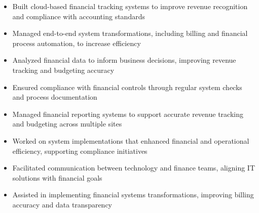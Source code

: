 \par\smallskip
\noindent
\begin{minipage}{20cm}
  \begin{minipage}{9.75cm}
    \begin{itemize}
      \item Built cloud-based financial tracking systems to improve revenue recognition and compliance with accounting standards
      \item Managed end-to-end system transformations, including billing and financial process automation, to increase efficiency
    \end{itemize}
  \end{minipage}
  \hfill
  \begin{minipage}{9.75cm}
    \begin{itemize}
      \item Analyzed financial data to inform business decisions, improving revenue tracking and budgeting accuracy
      \item Ensured compliance with financial controls through regular system checks and process documentation
    \end{itemize}
  \end{minipage}
\end{minipage}
\par\smallskip
\divider

\par\smallskip
\noindent
\begin{minipage}{20cm}
  \begin{minipage}{9.75cm}
    \begin{itemize}
      \item Managed financial reporting systems to support accurate revenue tracking and budgeting across multiple sites
      \item Worked on system implementations that enhanced financial and operational efficiency, supporting compliance initiatives
    \end{itemize}
  \end{minipage}
  \hfill
  \begin{minipage}{9.75cm}
    \begin{itemize}
      \item Facilitated communication between technology and finance teams, aligning IT solutions with financial goals
      \item Assisted in implementing financial systems transformations, improving billing accuracy and data transparency
    \end{itemize}
  \end{minipage}
\end{minipage}

